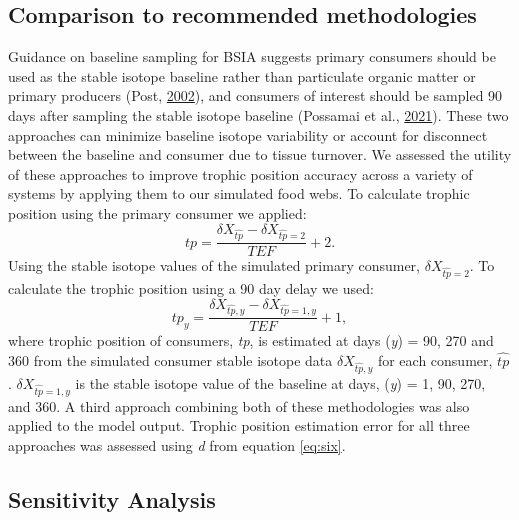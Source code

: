 \documentclass [11pt, proquest] {uwthesis}[2015/03/03]
\begin{document}
\subsection{Comparison to recommended
methodologies}\label{comparison-to-recommended-methodologies}

Guidance on baseline sampling for BSIA suggests primary consumers should
be used as the stable isotope baseline rather than particulate organic
matter or primary producers (Post,
\protect\hyperlink{ref-Post2002}{2002}), and consumers of interest
should be sampled 90 days after sampling the stable isotope baseline
(Possamai et al., \protect\hyperlink{ref-Possamai2021}{2021}). These two
approaches can minimize baseline isotope variability or account for
disconnect between the baseline and consumer due to tissue turnover. We
assessed the utility of these approaches to improve trophic position
accuracy across a variety of systems by applying them to our simulated
food webs. To calculate trophic position using the primary consumer we
applied:
\begin{equation} 
  tp = \frac{\delta X_{\widehat{tp}}
  -\delta X_{\widehat{tp}=2}}{TEF}+2.
  \label{eq:nine}
\end{equation}
Using the stable isotope values of the simulated primary consumer,
\(\delta X_{\widehat{tp}=2}\). To calculate the trophic position using a
90 day delay we used:
\begin{equation} 
  tp_y = \frac{\delta X_{\widehat{tp},y}
  -\delta X_{\widehat{tp}=1,y}}{TEF}+1,
  \label{eq:nine}
\end{equation}
where trophic position of consumers, \emph{tp}, is estimated at days
(\emph{y}) = 90, 270 and 360 from the simulated consumer stable isotope
data \(\delta X_{\widehat{tp},y}\) for each consumer, \(\widehat{tp}\).
\(\delta X_{\widehat{tp}=1,y}\) is the stable isotope value of the
baseline at days, (\emph{y}) = 1, 90, 270, and 360. A third approach
combining both of these methodologies was also applied to the model
output. Trophic position estimation error for all three approaches was
assessed using \emph{d} from equation \eqref{eq:six}.

\subsection{Sensitivity Analysis}\label{sensitivity-analysis}
\end{document}
